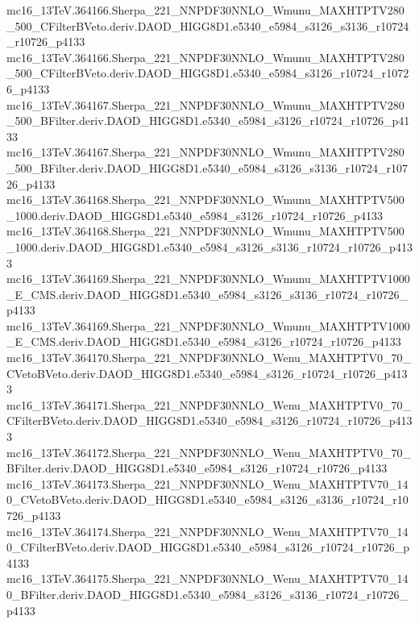 \begin{scriptsize}
mc16\_13TeV.364166.Sherpa\_221\_NNPDF30NNLO\_Wmunu\_MAXHTPTV280\_500\_CFilterBVeto.deriv.DAOD\_HIGG8D1.e5340\_e5984\_s3126\_s3136\_r10724\_r10726\_p4133 \\
mc16\_13TeV.364166.Sherpa\_221\_NNPDF30NNLO\_Wmunu\_MAXHTPTV280\_500\_CFilterBVeto.deriv.DAOD\_HIGG8D1.e5340\_e5984\_s3126\_r10724\_r10726\_p4133 \\
mc16\_13TeV.364167.Sherpa\_221\_NNPDF30NNLO\_Wmunu\_MAXHTPTV280\_500\_BFilter.deriv.DAOD\_HIGG8D1.e5340\_e5984\_s3126\_r10724\_r10726\_p4133 \\
mc16\_13TeV.364167.Sherpa\_221\_NNPDF30NNLO\_Wmunu\_MAXHTPTV280\_500\_BFilter.deriv.DAOD\_HIGG8D1.e5340\_e5984\_s3126\_s3136\_r10724\_r10726\_p4133 \\
mc16\_13TeV.364168.Sherpa\_221\_NNPDF30NNLO\_Wmunu\_MAXHTPTV500\_1000.deriv.DAOD\_HIGG8D1.e5340\_e5984\_s3126\_r10724\_r10726\_p4133 \\
mc16\_13TeV.364168.Sherpa\_221\_NNPDF30NNLO\_Wmunu\_MAXHTPTV500\_1000.deriv.DAOD\_HIGG8D1.e5340\_e5984\_s3126\_s3136\_r10724\_r10726\_p4133 \\
mc16\_13TeV.364169.Sherpa\_221\_NNPDF30NNLO\_Wmunu\_MAXHTPTV1000\_E\_CMS.deriv.DAOD\_HIGG8D1.e5340\_e5984\_s3126\_s3136\_r10724\_r10726\_p4133 \\
mc16\_13TeV.364169.Sherpa\_221\_NNPDF30NNLO\_Wmunu\_MAXHTPTV1000\_E\_CMS.deriv.DAOD\_HIGG8D1.e5340\_e5984\_s3126\_r10724\_r10726\_p4133 \\
mc16\_13TeV.364170.Sherpa\_221\_NNPDF30NNLO\_Wenu\_MAXHTPTV0\_70\_CVetoBVeto.deriv.DAOD\_HIGG8D1.e5340\_e5984\_s3126\_r10724\_r10726\_p4133 \\
mc16\_13TeV.364171.Sherpa\_221\_NNPDF30NNLO\_Wenu\_MAXHTPTV0\_70\_CFilterBVeto.deriv.DAOD\_HIGG8D1.e5340\_e5984\_s3126\_r10724\_r10726\_p4133 \\
mc16\_13TeV.364172.Sherpa\_221\_NNPDF30NNLO\_Wenu\_MAXHTPTV0\_70\_BFilter.deriv.DAOD\_HIGG8D1.e5340\_e5984\_s3126\_r10724\_r10726\_p4133 \\
mc16\_13TeV.364173.Sherpa\_221\_NNPDF30NNLO\_Wenu\_MAXHTPTV70\_140\_CVetoBVeto.deriv.DAOD\_HIGG8D1.e5340\_e5984\_s3126\_s3136\_r10724\_r10726\_p4133 \\
mc16\_13TeV.364174.Sherpa\_221\_NNPDF30NNLO\_Wenu\_MAXHTPTV70\_140\_CFilterBVeto.deriv.DAOD\_HIGG8D1.e5340\_e5984\_s3126\_r10724\_r10726\_p4133 \\
mc16\_13TeV.364175.Sherpa\_221\_NNPDF30NNLO\_Wenu\_MAXHTPTV70\_140\_BFilter.deriv.DAOD\_HIGG8D1.e5340\_e5984\_s3126\_s3136\_r10724\_r10726\_p4133 \\

\end{scriptsize}
